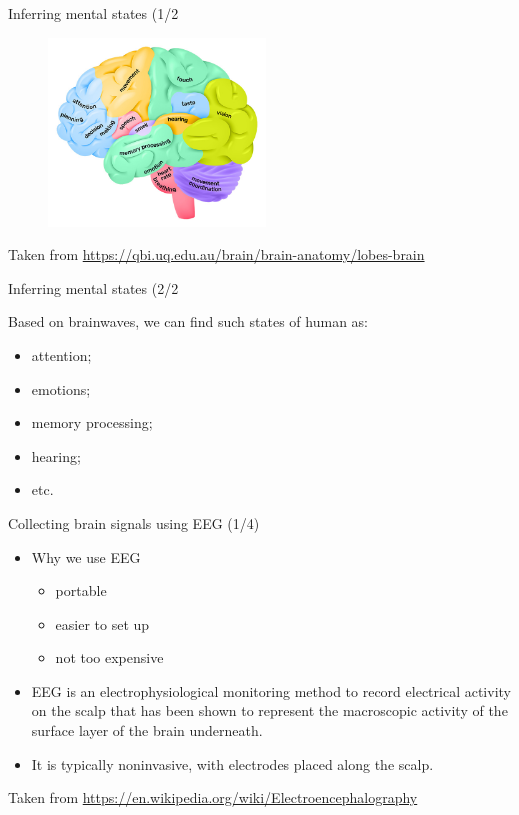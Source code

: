 \documentclass{beamer}
\begin{document}
\begin{frame}
{\centerline{Inferring mental states (1/2}}
    \begin{figure}
        \centering
        \includegraphics[height=5cm]{P2023.AIBCCSS.BrainSignals/Lobes-of-the-brain-QBI.jpg}
    \end{figure}
    \begin{center}
        \tiny{Taken from \url{https://qbi.uq.edu.au/brain/brain-anatomy/lobes-brain}}
    \end{center}
\end{frame}

\begin{frame}
{\centerline{Inferring mental states (2/2}}
    Based on brainwaves, we can find such states of human as:
    \begin{itemize}
        \item attention;
        \item emotions;
        \item memory processing;
        \item hearing;
        \item etc.
    \end{itemize}
\end{frame}

\begin{frame}
{\centerline{Collecting brain signals using EEG (1/4)}}
    \begin{itemize}
        \item Why we use EEG
     \begin{itemize}
         \item portable
         \item easier to set up
         \item not too expensive
     \end{itemize}
     \item EEG is an electrophysiological monitoring method to record electrical activity on the scalp that has been shown to represent the macroscopic activity of the surface layer of the brain underneath. 
     \item It is typically noninvasive, with electrodes placed along the scalp.
    \end{itemize}
     \begin{center}
         \tiny{Taken from \url{https://en.wikipedia.org/wiki/Electroencephalography}}
     \end{center}
\end{frame}
\end{document}
